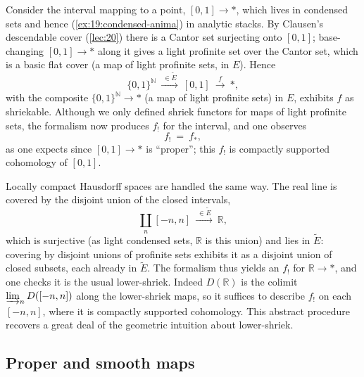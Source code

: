 \begin{example}
\label{ex:21:interval}
Consider the interval mapping to a point, $[0,1]\to\ast$, which lives in
condensed sets and hence (\cref{ex:19:condensed-anima}) in analytic stacks. By
Clausen's descendable cover (\cref{lec:20}) there is a Cantor set surjecting onto
$[0,1]$; base-changing $[0,1]\to\ast$ along it gives a light profinite set over
the Cantor set, which is a basic flat cover (a map of light profinite sets, in
$E$). Hence
\begin{equation*}
\{0,1\}^{\mathbb N}\ \xrightarrow{\ \in\widetilde E\ }\ [0,1]\
\xrightarrow{\ f\ }\ \ast,
\end{equation*}
with the composite $\{0,1\}^{\mathbb N}\to\ast$ (a map of light profinite sets)
in $E$, exhibits $f$ as shriekable. Although we only
defined shriek functors for maps of light profinite sets, the formalism now
produces $f_!$ for the interval, and one observes
\begin{equation*}
f_!\ =\ f_* ,
\end{equation*}
as one expects since $[0,1]\to\ast$ is ``proper''; this $f_!$ is compactly
supported cohomology of $[0,1]$.
\end{example}

\begin{example}
\label{ex:21:real-line}
Locally compact Hausdorff spaces are handled the same way. The real line is
covered by the disjoint union of the closed intervals,
\begin{equation*}
\coprod_{n}[-n,n]\ \xrightarrow{\ \in\widetilde E\ }\ \mathbb R ,
\end{equation*}
which is surjective (as light condensed sets, $\mathbb R$ is this union) and lies
in $\widetilde E$: covering by disjoint unions of profinite sets exhibits it as a
disjoint union of closed subsets, each already in $\widetilde E$. The formalism
thus yields an $f_!$ for $\mathbb R\to\ast$, and one checks it is the usual
lower-shriek. Indeed $D(\mathbb R)$ is the colimit
$\varinjlim_n D([-n,n])$ along the lower-shriek maps, so it suffices to describe
$f_!$ on each $[-n,n]$, where it is compactly supported cohomology. This abstract
procedure recovers a great deal of the geometric intuition about lower-shriek.
\end{example}

\subsection{Proper and smooth maps}
\label{subsec:21:proper-smooth}

